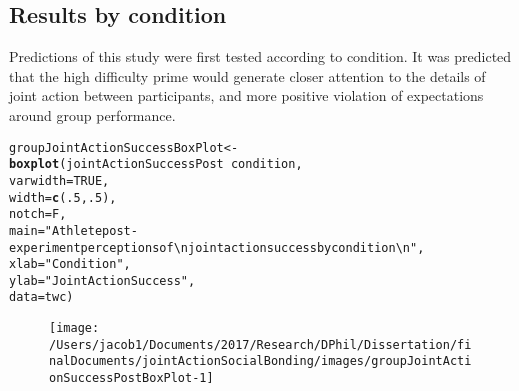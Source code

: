 \documentclass[english]{article}\usepackage[]{graphicx}\usepackage[]{color}
\makeatletter
\def\maxwidth{ %
  \ifdim\Gin@nat@width>\linewidth
    \linewidth
  \else
    \Gin@nat@width
  \fi
}
\newcommand{\hlnum}[1]{\textcolor[rgb]{0.686,0.059,0.569}{#1}}%
\newcommand{\hlstr}[1]{\textcolor[rgb]{0.192,0.494,0.8}{#1}}%
\newcommand{\hlopt}[1]{\textcolor[rgb]{0,0,0}{#1}}%
\newcommand{\hlstd}[1]{\textcolor[rgb]{0.345,0.345,0.345}{#1}}%
\newcommand{\hlkwb}[1]{\textcolor[rgb]{0.69,0.353,0.396}{#1}}%
\newcommand{\hlkwc}[1]{\textcolor[rgb]{0.333,0.667,0.333}{#1}}%
\newcommand{\hlkwd}[1]{\textcolor[rgb]{0.737,0.353,0.396}{\textbf{#1}}}%
\newenvironment{kframe}{%
 \def\at@end@of@kframe{}%
 \ifinner\ifhmode%
  \def\at@end@of@kframe{\end{minipage}}%
  \begin{minipage}{\columnwidth}%
 \fi\fi%
 \def\FrameCommand##1{\hskip\@totalleftmargin \hskip-\fboxsep
 \colorbox{shadecolor}{##1}\hskip-\fboxsep
     \hskip-\linewidth \hskip-\@totalleftmargin \hskip\columnwidth}%
 \MakeFramed {\advance\hsize-\width
   \@totalleftmargin\z@ \linewidth\hsize
   \@setminipage}}%
 {\par\unskip\endMakeFramed%
 \at@end@of@kframe}
\newenvironment{knitrout}{}{} %
\makeatother
\begin{document}
\subsection{Results by condition}
Predictions of this study were first tested according to condition. It was predicted that the high difficulty prime would generate closer attention to the details of joint action between participants, and more positive violation of expectations around group performance.


\begin{knitrout}
\color{fgcolor}\begin{kframe}
\begin{alltt}
  \hlstd{groupJointActionSuccessBoxPlot} \hlkwb{<-} \hlkwd{boxplot}\hlstd{(jointActionSuccessPost} \hlopt{~} \hlstd{condition,}
                                          \hlkwc{varwidth} \hlstd{=} \hlnum{TRUE}\hlstd{,}
                                          \hlkwc{width} \hlstd{=} \hlkwd{c}\hlstd{(}\hlnum{.5}\hlstd{,}\hlnum{.5}\hlstd{),}
                                          \hlkwc{notch} \hlstd{= F,}
                                          \hlkwc{main} \hlstd{=} \hlstr{"Athlete post-experiment perceptions of \textbackslash{}n joint action success by condition \textbackslash{}n"}\hlstd{,}
                                          \hlkwc{xlab} \hlstd{=} \hlstr{"Condition"}\hlstd{,}
                                          \hlkwc{ylab} \hlstd{=} \hlstr{"Joint Action Success"}\hlstd{,}
                                          \hlkwc{data} \hlstd{= twc)}
\end{alltt}
\end{kframe}\begin{figure}

{\centering \texttt{[image: /Users/jacob1/Documents/2017/Research/DPhil/Dissertation/finalDocuments/jointActionSocialBonding/images/groupJointActionSuccessPostBoxPlot-1]} 

}

\end{figure}


\end{knitrout}
\end{document}
